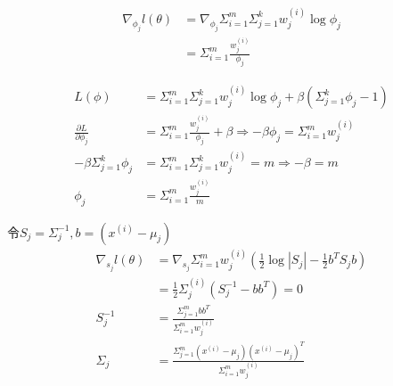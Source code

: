 \documentclass[a4paper,14pt]{report}
\begin{document}
\begin{equation}
    \begin{split}
        \nabla _{ \phi _j}l(\theta) &= \nabla _{ \phi _j} \Sigma_{i=1}^m  \Sigma_{j=1}^k w_j^{(i)} \log \phi _j \\
                                    &= \Sigma_{i=1}^m \frac{w_j^{(i)}}{\phi_j}
    \end{split}
\end{equation}

\begin{equation}
    \begin{split} 
        L(\phi) &= \Sigma_{i=1}^m \Sigma_{j=1}^k w_j^{(i)} \log \phi_j +\beta(\Sigma_{j=1}^k \phi_j - 1) \\
        \frac{\partial L}{\partial \phi_j} &=  \Sigma_{i=1}^m \frac{w_j^{(i)}} {\phi_j} + \beta  \Rightarrow 
      -\beta \phi_j = \Sigma_{i=1}^m w_j^{(i)} \\
      -\beta \Sigma_{j=1}^k \phi_j &= \Sigma_{i=1}^m \Sigma_{j=1}^k w_j^{(i)} = m \Rightarrow -\beta = m \\
    \phi_j &= \Sigma_{i=1}^m \frac{w_j^{(i)}}{m}
    \end{split}
\end{equation}

令$S_j = \Sigma_j^{-1}, b = (x^{(i)}-\mu_j)$ \\
\begin{equation}
    \begin{split}
    \nabla_{s_j}l(\theta) &= \nabla_{s_j} \Sigma_{i=1}^m w_j^{(i)}(\frac{1}{2}\log|S_j|-\frac{1}{2}b^T S_j b) \\
                          &= \frac{1}{2}\Sigma_j^{(i)}(S_j^{-1}-bb^T) = 0\\
                 S_j^{-1} &= \frac{\Sigma_{j=1}^m bb^T}{\Sigma_{i=1}^m w_j^{(i)}} \\
                 \Sigma_j &= \frac{\Sigma_{j=1}^m (x^{(i)}-\mu_j)(x^{(i)}-\mu_j)^T}{\Sigma_{i=1}^m w_j^{(i)}}
    \end{split}
\end{equation}

\begin{equation}
    \begin{split}    
    \end{split}
\end{equation}
\end{document}
